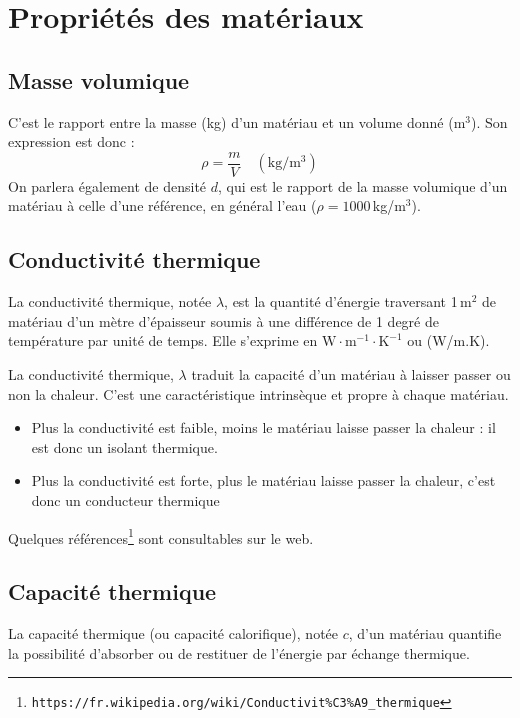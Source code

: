 \section{Propriétés des matériaux}

\subsection*{Masse volumique}
C'est le rapport entre la masse (kg) d'un matériau et un volume donné (m$^3$). Son expression est donc :
\begin{equation}
  \rho = \frac{m}{V} \quad \mathrm{(kg/m^3)}
\end{equation}
On parlera également de densité $d$, qui est le rapport de la masse volumique d'un matériau à celle d'une référence, en général l'eau ($\rho = 1000$\,kg/m$^3$).

\subsection*{Conductivité thermique}
La conductivité thermique, notée $\lambda$, est la quantité d'énergie traversant 1\,m$^2$ de matériau d'un mètre d'épaisseur soumis à une différence de 1 degré de température par unité de temps. Elle s'exprime en $\mathrm{W\cdot m^{-1}\cdot K^{-1}}$ ou (W/m.K).

La conductivité thermique, $\lambda$ traduit la capacité d'un matériau à laisser passer ou non la chaleur. C'est une caractéristique intrinsèque et propre à chaque matériau.
\begin{itemize}
    \item Plus la conductivité est faible, moins le matériau laisse passer la chaleur : il est donc un isolant thermique.
    \item Plus la conductivité est forte, plus le matériau laisse passer la chaleur, c'est donc un conducteur thermique
\end{itemize}
  
Quelques références\footnote{\texttt{https://fr.wikipedia.org/wiki/Conductivit\%C3\%A9\_thermique}} sont consultables sur le web.

\subsection*{Capacité thermique}
La capacité thermique (ou capacité calorifique), notée $c$, d'un matériau quantifie la possibilité d'absorber ou de restituer de l'énergie par échange thermique.

